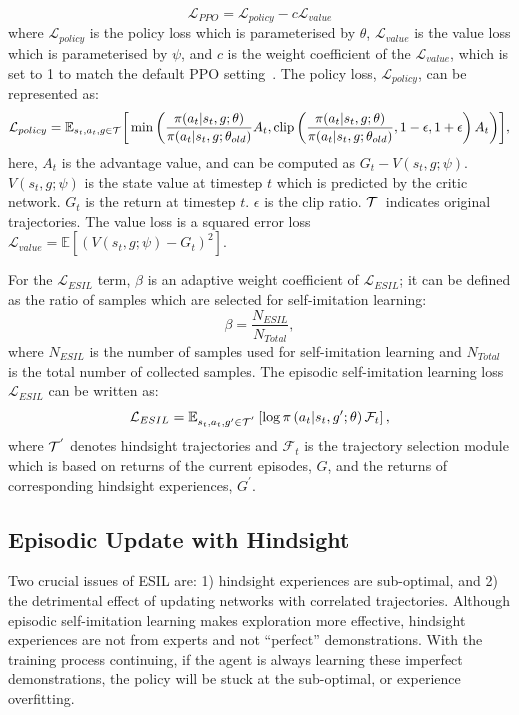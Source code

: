 \begin{equation}
  \mathcal{L}_{PPO} = \mathcal{L}_{policy} - c\mathcal{L}_{value}
  \label{eq:ppo_loss}
\end{equation}
where $\mathcal{L}_{policy}$ is the policy loss which is parameterised by $\theta$, $\mathcal{L}_{value}$ is the value loss which is parameterised by $\psi$, and $c$ is the weight coefficient of the $\mathcal{L}_{value}$, which is set to 1 to match the default PPO setting~\cite{schulman2017proximal}. The policy loss, $\mathcal{L}_{policy}$, can be represented as:
\begin{equation}
  \centering
  \mathcal{L}_{policy} = \mathbb{E}_{s_{t}, a_{t}, g\in\Tau}\biggr[\min \left (\frac{\pi(a_{t}|s_{t}, g;\theta)}{\pi(a_{t}|s_{t}, g;\theta_{old})}A_{t}, \clip \left (\frac{\pi(a_{t}|s_{t}, g;\theta)}{\pi(a_{t}|s_{t}, g;\theta_{old})}, 1-\epsilon, 1+\epsilon \right )A_{t}\right )\biggr],
  \label{eq:policy_loss}
\end{equation}
here, $A_{t}$ is the advantage value, and can be computed as $G_{t} - V(s_{t}, g;\psi)$. $V(s_{t}, g;\psi)$ is the state value at timestep $t$ which is predicted by the critic network. $G_{t}$ is the return at timestep $t$. $\epsilon$ is the clip ratio. $\mathcal{T}$~indicates original trajectories. {The value loss is a squared error loss $\mathcal{L}_{value}=\mathbb{E}[(V(s_{t}, g;\psi) - G_{t})^{2}]$.}

For the $\mathcal{L}_{ESIL}$ term, $\beta$ is an adaptive weight coefficient of $\mathcal{L}_{ESIL}$; it can be defined as the ratio of samples which are selected for self-imitation learning:
\begin{equation}
  \beta=\frac{N_{ESIL}}{N_{Total}},
\end{equation}
where $N_{ESIL}$ is the number of samples used for self-imitation learning and $N_{Total}$ is the total number of collected samples.
The episodic self-imitation learning loss $\mathcal{L}_{ESIL}$ can be written as: 
\begin{equation}
  \centering
  \mathcal{L}_{ESIL}=\mathbb{E}_{s_{t}, a_{t}, g^\prime\in\Tau^{'}}\left[\log\pi\left(a_{t}|s_{t}, g^\prime;\theta\right)\mathcal{F}_t\right],
  \label{eq:imitaion}
\end{equation}
where $\mathcal{T}^{'}$ denotes hindsight trajectories and $\mathcal{F}_t$ is the trajectory selection module which is based on returns of the current episodes, $G$, and the returns of corresponding hindsight experiences, $G^{\prime}$.

\subsection{Episodic Update with Hindsight}
Two crucial issues of ESIL are: 1) hindsight experiences are sub-optimal, and 2) the {detrimental} effect of updating networks with correlated trajectories. 
Although episodic self-imitation learning makes exploration more effective, hindsight experiences are not from experts and not ``perfect'' demonstrations.  With the training process continuing, if the agent is always learning these imperfect demonstrations, the policy will be stuck at the sub-optimal, or experience overfitting.

